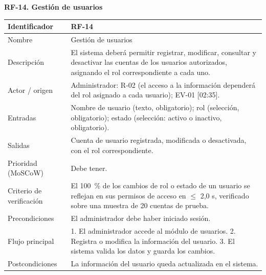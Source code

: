 \documentclass[12pt,a4paper]{article}
\begin{document}
\begin{minipage}{\linewidth}
\bigskip
\noindent\textbf{RF-14. Gestión de usuarios}
\label{tab:RF-14}

\begin{center}
\begin{tabular}{|p{3.5cm}|p{10.7cm}|}
\hline
Identificador & RF-14 \\
\hline
Nombre & Gestión de usuarios \\
\hline
Descripción & El sistema deberá permitir registrar, modificar, consultar y desactivar las cuentas de los usuarios autorizados, asignando el rol correspondiente a cada uno. \\
\hline
Actor / origen & Administrador: R-02 (el acceso a la información dependerá del rol asignado a cada usuario); EV-01 [02:35]. \\
\hline
Entradas & Nombre de usuario (texto, obligatorio); rol (selección, obligatorio); estado (selección: activo o inactivo, obligatorio). \\
\hline
Salidas & Cuenta de usuario registrada, modificada o desactivada, con el rol correspondiente. \\
\hline
Prioridad (MoSCoW) & Debe tener. \\
\hline
Criterio de verificación & El 100~\% de los cambios de rol o estado de un usuario se reflejan en sus permisos de acceso en $\leq$ 2,0 s, verificado sobre una muestra de 20 cuentas de prueba. \\
\hline
Precondiciones & El administrador debe haber iniciado sesión. \\
\hline
Flujo principal & 1. El administrador accede al módulo de usuarios. 2. Registra o modifica la información del usuario. 3. El sistema valida los datos y guarda los cambios. \\
\hline
Postcondiciones & La información del usuario queda actualizada en el sistema. \\
\hline
\end{tabular}
\end{center}
\end{minipage}
\end{document}
